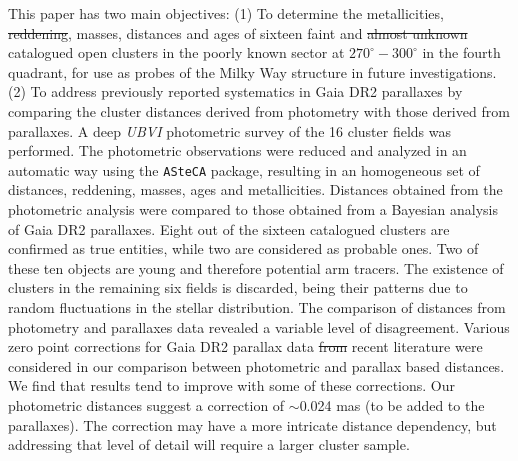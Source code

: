 \documentclass[draft]{aa}
\providecommand{\DIFaddtex}[1]{{\protect\color{blue}\uwave{#1}}} %
\providecommand{\DIFdeltex}[1]{{\protect\color{red}\sout{#1}}}                      %
\providecommand{\DIFaddbegin}{} %
\providecommand{\DIFaddend}{} %
\providecommand{\DIFdelbegin}{} %
\providecommand{\DIFdelend}{} %
\providecommand{\DIFadd}[1]{\texorpdfstring{\DIFaddtex{#1}}{#1}} %
\providecommand{\DIFdel}[1]{\texorpdfstring{\DIFdeltex{#1}}{}} %
\newcommand{\DIFscaledelfig}{0.5}
\newlength{\DIFdelgraphicswidth} %
\newlength{\DIFdelgraphicsheight} %
\newcommand{\DIFaddincludegraphics}[2][]{{\color{blue}\fbox{\DIFOincludegraphics[#1]{#2}}}} %
\newcommand{\DIFdelincludegraphics}[2][]{%
\sbox{\DIFdelgraphicsbox}{\DIFOincludegraphics[#1]{#2}}%
\settoboxwidth{\DIFdelgraphicswidth}{\DIFdelgraphicsbox} %
\settoboxtotalheight{\DIFdelgraphicsheight}{\DIFdelgraphicsbox} %
\scalebox{\DIFscaledelfig}{%
\parbox[b]{\DIFdelgraphicswidth}{\usebox{\DIFdelgraphicsbox}\\[-\baselineskip] \rule{\DIFdelgraphicswidth}{0em}}\llap{\resizebox{\DIFdelgraphicswidth}{\DIFdelgraphicsheight}{%
\setlength{\unitlength}{\DIFdelgraphicswidth}%
\begin{picture}(1,1)%
\thicklines\linethickness{2pt} %
{\color[rgb]{1,0,0}\put(0,0){\framebox(1,1){}}}%
{\color[rgb]{1,0,0}\put(0,0){\line( 1,1){1}}}%
{\color[rgb]{1,0,0}\put(0,1){\line(1,-1){1}}}%
\end{picture}%
}\hspace*{3pt}}} %
} %
\DeclareRobustCommand{\DIFaddbegin}{\DIFOaddbegin \let\includegraphics\DIFaddincludegraphics} %
\DeclareRobustCommand{\DIFaddend}{\DIFOaddend \let\includegraphics\DIFOincludegraphics} %
\DeclareRobustCommand{\DIFdelbegin}{\DIFOdelbegin \let\includegraphics\DIFdelincludegraphics} %
\DeclareRobustCommand{\DIFdelend}{\DIFOaddend \let\includegraphics\DIFOincludegraphics} %
\begin{document}
\abstract
{}
{This paper has two main objectives: (1) To determine the metallicities,
\DIFdelbegin \DIFdel{reddening}\DIFdelend \DIFaddbegin \DIFadd{reddenings}\DIFaddend , masses, distances and ages of sixteen faint and \DIFdelbegin \DIFdel{almost unknown
}\DIFdelend \DIFaddbegin \DIFadd{mostly unstudied 
}\DIFaddend catalogued open clusters in the poorly known sector at $270^\circ-300^\circ$ in
the fourth quadrant, for use as probes of the Milky Way structure in future
investigations. (2) To address previously reported systematics in Gaia DR2
parallaxes by comparing the cluster distances derived from photometry with
those derived from parallaxes.}
%
{A deep \textit{UBVI} photometric survey of the 16 cluster fields was
performed. The photometric observations were reduced and \DIFaddbegin \DIFadd{then }\DIFaddend analyzed in an
automatic way using the \texttt{ASteCA} package, resulting in an homogeneous
set of distances, reddening, masses, ages and metallicities. Distances obtained
from the photometric analysis were compared to those obtained from a Bayesian
analysis of Gaia DR2 parallaxes.}
%
{Eight out of the sixteen catalogued clusters are confirmed as true entities,
while two are considered as probable ones. Two of these ten objects are
young and therefore potential arm tracers. The existence of clusters in the
remaining six fields is discarded, being their patterns due to random
fluctuations in the stellar distribution. The comparison of distances from
photometry and parallaxes data revealed a variable level of disagreement.}
%
{
Various zero point corrections for Gaia DR2 parallax data \DIFdelbegin \DIFdel{from }\DIFdelend \DIFaddbegin \DIFadd{reported in }\DIFaddend recent
literature were considered in our comparison between photometric and parallax
based distances. We find that results tend to improve with some of these
corrections. Our photometric distances suggest a correction of $\sim$0.024 mas 
(to be added to the parallaxes). The correction may have a more intricate
distance dependency, but addressing that level of detail will require a larger
cluster sample.}


\maketitle
\end{document}
